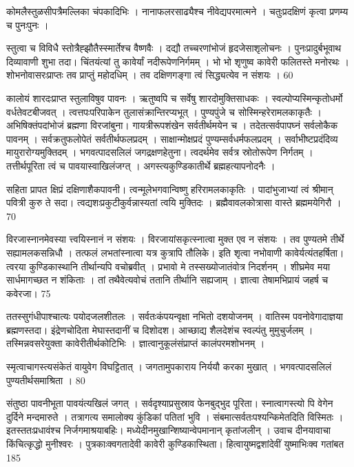 कोमलैस्तुळसीपत्रैमल्लिका चंपकादिभिः ।
नानाफलरसाढ्यैश्च नीवेद्यपरमात्मने ।
चतुःप्रदक्षिणं कृत्वा प्रणम्य च पुनःपुनः ।

स्तुत्वा च विविधै स्तोत्रैह्झौतैस्स्मार्तेश्च वैष्णवैः ।
दद्यौ तच्चरणांभोजं हृदजेसाशृलोचनः ।
पुनःप्रादुर्बभूवाथ दिव्यावाणी शुभा तदा।
चिंतयंत्यां तु कावेर्यां नदीरूपेणनिर्गमम् ।
भो भो शृणुष्व कावेरी फलितस्ते मनोरथः ।
शोभनोवासरःप्राप्तः तव प्राप्तुं महोदधिम् ।
तव दक्षिणगङ्गा त्वं सिद्ध्यत्येव न संशयः ।
60

कालोयं शारदःप्राप्त स्तुलाविषुव पावनः ।
ऋतुष्वपि च सर्वेषु शारदोमुक्तिसाधकः ।
स्वल्पोप्यस्मिन्कृतोधर्मो वर्धतेवटबीजवत् ।
त्वत्तपःपरिपाकेन तुलासंक्रान्तिरप्यभूत् ।
पुण्यपुंजे च सोस्मिन्हरेरामलकाकृतैः ।
अभिषिक्तंपदांभोजं ब्रह्मणा विरजांबुना।
गायत्रीरूपशंखेन सर्वतीर्थमयेन च ।
तदेतत्सर्वपापघ्नं सर्वलोकैक पावनम् ।
सर्वक्रतुफलोपेतं सर्वतीर्थफलप्रदम् ।
साक्षान्मोक्षप्रदं पुण्यम्सर्वधर्मफलप्रदम् ।
सर्वाभीष्टप्रदंदिव्य मायुरारोग्यमुक्तिदम् ।
भगवत्पादसलिलं जगद्रक्षणहेतुना।
त्वदर्थमेव सर्वत्र स्रोतोरूपेण निर्गतम् ।
तत्तीर्थपूरिता त्वं च पावयास्वाखिलंजग्त् ।
अगस्त्यकुण्डिकातीर्थे ब्रह्महत्यापनोदनैः ।

सहिता प्रापत क्षिप्रं दक्षिणाशैकपावनी।
त्वन्मूलेभगवान्विष्णु हरिरामलकाकृतिः ।
पादांभुजाभ्यां त्वं श्रीमान् पवित्री कुरु ते सदा।
त्वद्यशःप्रकुटीकुर्वन्नास्यतां त्वयि मुक्तिदः ।
ब्रह्मैवावलकोत्रासा वास्ते ब्रह्ममयेगिरौ ।
70

विरजास्नानमेवस्या त्त्वयिस्नानं न संशयः ।
विरजायांसकृत्स्नात्वा मुक्त एव न संशयः ।
तव पुण्यतमे तीर्थे सह्यामलकसन्निधौ ।
तत्फलं लभतांस्नात्वा यत्र कुत्रापि तौलिके।
इति शृत्वा नभोवाणी कावेर्यत्यंतहर्षिता।
त्वरया कुण्डिकास्थानि तीर्थान्यपि वचोब्रवीत् ।
प्रभावो मे तस्सख्योजातंवोत्र निदर्शनम् ।
शीघ्रमेव मया सार्धमागच्छत न शंकिताः ।
तां तथैवेत्यवोचं ततानि तीर्थानि सह्यजाम् ।
ज्ञात्वा तेषामभिप्रायं जहर्ष च कवेरजा।
75

ततस्सुगंधीपाश्चात्यः पयोदजलशीतलः ।
सर्वतःकंपयन्वृक्षा नभितो दशयोजनम् ।
वातिस्म पवनोवेगादाज्ञया ब्रह्मणस्तदा।
इंद्रेणचोदिता मेघास्तदानीं च दिशोदश।
आच्छाद्य शैलदेशंच स्वल्पंतु मुमुचुर्जलम् ।
तस्मिन्नवसरेयुक्ता कावेरीतीर्थकोटिभिः ।
ज्ञात्वानुकूलंसंप्राप्तं कालंपरमशोभनम् ।

स्मृत्वाचागस्त्यसंकेतं वायुवेग विघट्टितात् ।
जगतामुपकाराय निर्ययौ करका मुखात् ।
भगवत्पादसलिलं पुण्यतीर्थसमाश्रिता ।
80

संतुष्ठा पावनीभूता पावयंत्यखिलं जगत् ।
सर्वदृश्याप्रसुस्राव फेनबुद्भुद पूरिता।
स्नात्वागस्त्यो पि वेगेन दुर्दिने मन्दमारुते ।
तत्रागत्य समालोक्य कुंडिकां पतितां भुवि ।
संबमात्सर्वतःपश्यन्किमेतदिति विस्मितः ।
इतस्ततःप्रधावंश्च निर्जगमाश्रयाबहिः।
मध्येदीनमुखान्शिष्यान्वेपमानान् कृतांजलीन् ।
उवाच दीनयावाचा किंचित्कृद्धो मुनीश्वरः ।
पुत्रकाःक्वगतादेवी कावेरी कुण्डिकास्थिता।
हित्वायुष्मद्वशांदेवीं युष्माभिःक्व गतांबत 185

